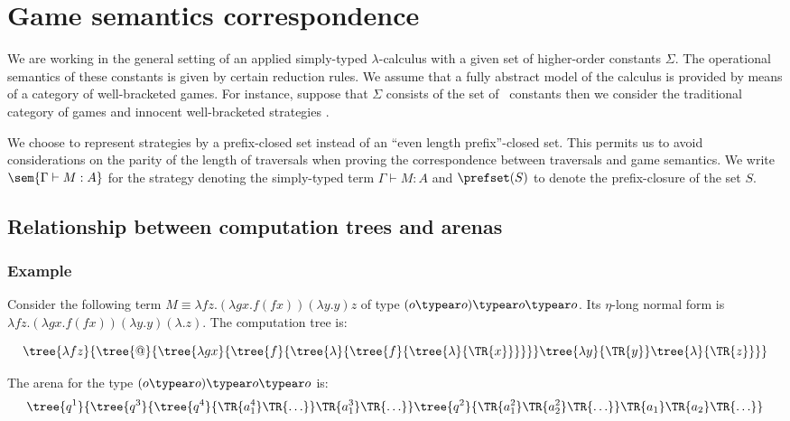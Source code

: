 \section{Game semantics correspondence}

We are working in the general setting of an applied simply-typed
$\lambda$-calculus with a given set of higher-order constants
$\Sigma$. The operational semantics of these constants is given by
certain reduction rules. We assume that a fully abstract model of
the calculus is provided by means of a category of well-bracketed
games. For instance, suppose that $\Sigma$ consists of the set of
\pcf\ constants then we consider the traditional category of games
and innocent well-bracketed strategies
\cite{hylandong_pcf,abramsky94full}.

We choose to represent strategies by a prefix-closed set instead of
an ``even length prefix''-closed set. This permits us to avoid
considerations on the parity of the length of traversals when
proving the correspondence between traversals and game semantics. We
write $\sem{\Gamma \vdash M : A}$ for the strategy denoting the
simply-typed term $\Gamma \vdash M : A$ and $\prefset(S)$ to denote
the prefix-closure of the set $S$.


\subsection{Relationship between computation trees and arenas}

\subsubsection{Example}
Consider the following term $M \equiv \lambda f z . (\lambda g x . f (f x)) (\lambda y. y) z$ of type $(o \typear o) \typear o \typear o$.
Its $\eta$-long normal form is $\lambda f z . (\lambda g x . f (f x)) (\lambda y. y) (\lambda .z)$.
The computation tree is:

$$
\tree{\lambda f z}
{ \tree{@}
    {
        \tree{\lambda g x}
            { \tree{f}{   \tree{\lambda}{ \tree{f}{  \tree{\lambda}{\TR{x}}} }  }
            }
        \tree{\lambda y}{\TR{y}}
        \tree{\lambda}{\TR{z}}
    }
}
$$

The arena for the type $(o \typear o) \typear o \typear o$ is:
$$\tree{q^1}
{
    \tree{q^3}
        {  \tree{q^4}
                {\TR{a^4_1} \TR{\ldots}}
            \TR{a^3_1} \TR{\ldots} }
    \tree{q^2}
    { \TR{a^2_1} \TR{a^2_2}\TR{\ldots} }
    \TR{a_1} \TR{a_2}\TR{\ldots}
}
$$

